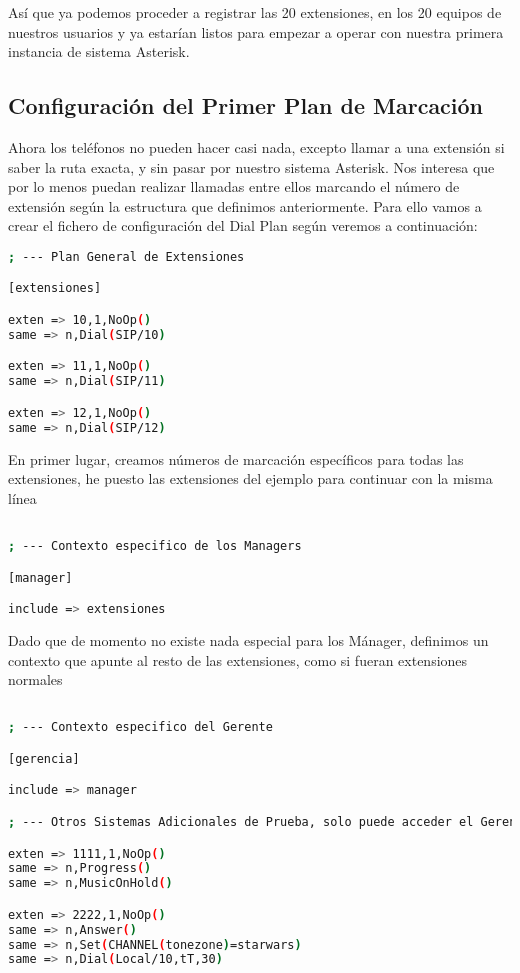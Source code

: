 Así que ya podemos proceder a registrar las 20 extensiones, en los 20 equipos de nuestros usuarios y ya estarían listos para empezar a operar con nuestra primera instancia de sistema Asterisk.

\newpage

\subsection{Configuración del Primer Plan de Marcación}

Ahora los teléfonos no pueden hacer casi nada, excepto llamar a una extensión si saber la ruta exacta, y sin pasar por nuestro sistema Asterisk. Nos interesa que por lo menos puedan realizar llamadas entre ellos marcando el número de extensión según la estructura que definimos anteriormente. Para ello vamos a crear el fichero de configuración del Dial Plan según veremos a continuación:

\begin{lstlisting}[language=bash,title={/etc/asterisk/extensions.conf}]
; --- Plan General de Extensiones

[extensiones]

exten => 10,1,NoOp()
same => n,Dial(SIP/10)

exten => 11,1,NoOp()
same => n,Dial(SIP/11)

exten => 12,1,NoOp()
same => n,Dial(SIP/12)

\end{lstlisting}

En primer lugar, creamos números de marcación específicos para todas las extensiones, he puesto las extensiones del ejemplo para continuar con la misma línea

\begin{lstlisting}[language=bash,title={/etc/asterisk/extensions.conf}]

; --- Contexto especifico de los Managers

[manager]

include => extensiones

\end{lstlisting}

Dado que de momento no existe nada especial para los Mánager, definimos un contexto que apunte al resto de las extensiones, como si fueran extensiones normales

\begin{lstlisting}[language=bash,title={/etc/asterisk/extensions.conf}]

; --- Contexto especifico del Gerente

[gerencia]

include => manager

; --- Otros Sistemas Adicionales de Prueba, solo puede acceder el Gerente.

exten => 1111,1,NoOp()
same => n,Progress()
same => n,MusicOnHold()

exten => 2222,1,NoOp()
same => n,Answer()
same => n,Set(CHANNEL(tonezone)=starwars)
same => n,Dial(Local/10,tT,30)

\end{lstlisting}

